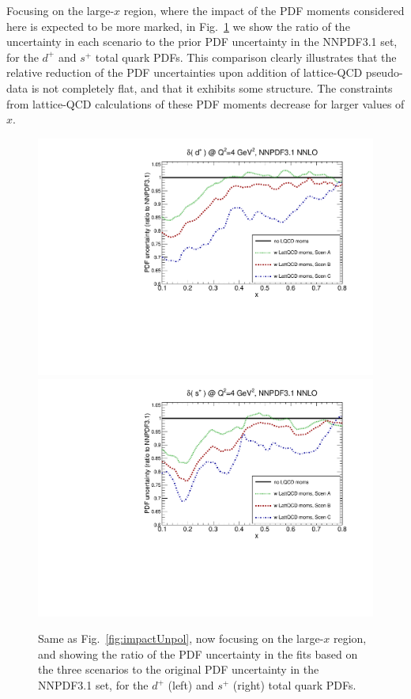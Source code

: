 Focusing on the large-$x$ region, where the
impact of the PDF moments considered here is expected to be more marked, in
Fig.~\ref{fig:impactUnpollargex} we show the ratio 
of the uncertainty in each scenario to the prior PDF 
uncertainty in the NNPDF3.1 set, for the $d^+$
and $s^+$ total quark PDFs.
%
This comparison clearly illustrates that the relative reduction
of the PDF uncertainties upon addition of lattice-QCD
pseudo-data is not completely flat, and that it exhibits some structure.
%
The constraints from lattice-QCD calculations of these 
PDF moments decrease for larger values of $x$.

\begin{figure}[!t]
\centering
\includegraphics[scale=0.45]{plots/xdp-unpol-lattice-relerr-largex.pdf}
\includegraphics[scale=0.45]{plots/xsp-unpol-lattice-relerr-largex.pdf}
\caption{\small Same as Fig.~\ref{fig:impactUnpol}, now focusing
  on the large-$x$ region, and showing the ratio of the
  PDF uncertainty in the fits based on the three scenarios
  to the original
  PDF uncertainty in the NNPDF3.1 set, for the $d^+$ (left)
  and $s^+$ (right) total quark PDFs.
}    
\label{fig:impactUnpollargex}
\end{figure}

